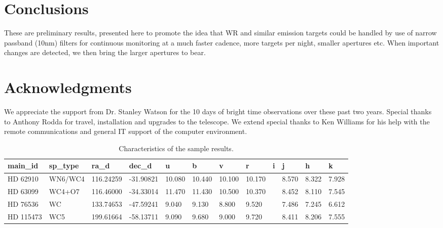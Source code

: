\documentclass[letter,11pt,oneside]{article}
\begin{document}
\section{Conclusions}

These are preliminary results, presented here to promote the idea
that WR and similar emission targets could be handled by use
of narrow passband (10nm) filters for continuous monitoring
at a much faster cadence, more targets per night, smaller
apertures etc. When important changes are detected, we then
bring the larger apertures to bear.

\section{Acknowledgments}

We appreciate the support from Dr. Stanley Watson for the 10 days of bright time observations
over these past two years. Special thanks to Anthony Rodda for travel, installation
and upgrades to the telescope. We extend special thanks to Ken Williams for his help
with the remote communications and general IT support of the computer environment.



\appendix
\renewcommand \thesection{\Alph{section}}


\begin{table}[h!]
{\small
\centering
\begin{tabular}{| l | l | l | l | l | l | l | l | l | l | l | l |}
\hline
  main\_id  & sp\_type &   ra\_d    &   dec\_d   &   u     &   b     &   v     &   r     & i  &   j    &   h    &   k       \\ 
\hline
 HD  62910  & WN6/WC4  & 116.24259  & -31.90821  & 10.080  & 10.440  & 10.100  & 10.170  &    & 8.570  & 8.322  & 7.928    \\ 
 HD  63099  & WC4+O7   & 116.46000  & -34.33014  & 11.470  & 11.430  & 10.500  & 10.370  &    & 8.452  & 8.110  & 7.545    \\ 
 HD  76536  & WC       & 133.74653  & -47.59241  &  9.040  &  9.130  &  8.800  &  9.520  &    & 7.486  & 7.245  & 6.612    \\ 
 HD 115473  & WC5      & 199.61664  & -58.13711  &  9.090  &  9.680  &  9.000  &  9.720  &    & 8.411  & 8.206  & 7.555    \\ 
\hline
\end{tabular}
\caption[TOC]{Characteristics of the sample results.}
\label{table:Characteristicsofthesampleresults.}
}
\end{table}
\end{document}
